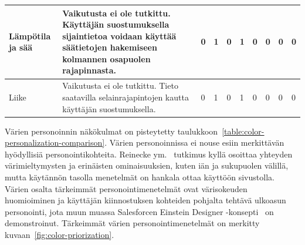 \documentclass[finnish, 12pt, a4paper, elec, utf8, a-1b]{aaltothesis}
\begin{document}
{\begin{longtable}{p{2.5cm}|p{6cm}|p{0.5cm}p{0.5cm}p{0.5cm}|p{0.5cm}|p{0.5cm}p{0.5cm}p{0.5cm}|p{0.5cm}|}
    \midrule
    Lämpötila ja sää                       & Vaikutusta ei ole tutkittu. Käyttäjän suostumuksella sijaintietoa voidaan käyttää säätietojen hakemiseen kolmannen osapuolen rajapinnasta.                                                                                                                                                                           & 0                                          & 1                                   & 0                                      & 1                            & 0                                               & 0                                         & 0                                         & 0                            \\
    \midrule
    Liike                                  & Vaikutusta ei ole tutkittu. Tieto saatavilla selainrajapintojen kautta käyttäjän suostumuksella.                                                                                                                                                                                                                     & 0                                          & 1                                   & 0                                      & 1                            & 0                                               & 0                                         & 0                                         & 0                            \\
\end{longtable}
}

Värien personoinnin näkökulmat on pisteytetty
taulukkoon~\ref{table:color-personalization-comparison}. Värien personoinnissa
ei nouse esiin merkittävän hyödyllisiä personointikohteita. Reinecke
ym.~\cite{10.1145/2556288.2557052} tutkimus kyllä osoittaa yhteyden
värimieltymysten ja erinäisten ominaisuuksien, kuten iän ja sukupuolen välillä,
mutta käytännön tasolla menetelmät on hankala ottaa käyttöön sivustolla. Värien
osalta tärkeimmät personointimenetelmät ovat värisokeuden huomioiminen ja
käyttäjän kiinnostuksen kohteiden pohjalta tehtävä ulkoasun personointi, jota
muun muassa Salesforcen Einstein Designer
-konsepti~\cite{salesforce-einstein-designer} on demonstroinut. Tärkeimmät
värien personointimenetelmät on merkitty kuvaan~\ref{fig:color-priorization}.
\end{document}
